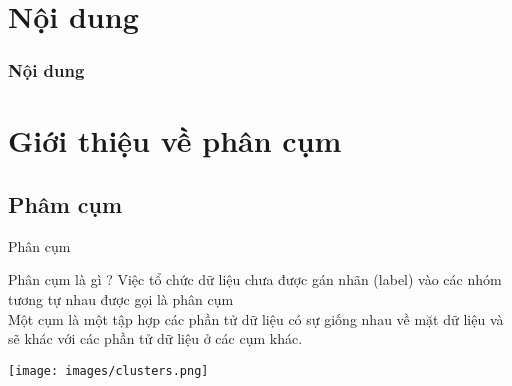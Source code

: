 \documentclass[english,10pt,table]{beamer}
\begin{document}
\begin{frame}
  \maketitle
\end{frame}

\section*{Nội dung}
\begin{frame}\frametitle<presentation>{Nội dung}
  \tableofcontents
\end{frame}


\section{Giới thiệu về phân cụm}
\subsection{Phâm cụm}
\begin{frame}{Phân cụm}		
	\begin{block}{Phân cụm là gì ?}
	 Việc tổ chức dữ liệu chưa được gán nhãn (label) vào các nhóm tương tự nhau được gọi là phân cụm \\
	 Một cụm là một tập hợp các phần tử dữ liệu có sự giống nhau về mặt dữ liệu và sẽ khác với các phần tử dữ liệu ở các cụm khác.
	 
  \end{block}
\texttt{[image: images/clusters.png]}
\end{frame}

\end{document}

